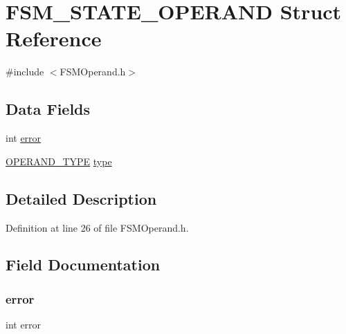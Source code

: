 \hypertarget{struct_f_s_m___s_t_a_t_e___o_p_e_r_a_n_d}{}\section{F\+S\+M\+\_\+\+S\+T\+A\+T\+E\+\_\+\+O\+P\+E\+R\+A\+ND Struct Reference}
\label{struct_f_s_m___s_t_a_t_e___o_p_e_r_a_n_d}


{\ttfamily \#include $<$F\+S\+M\+Operand.\+h$>$}

\subsection*{Data Fields}
\begin{DoxyCompactItemize}
\item 
int \mbox{\hyperlink{struct_f_s_m___s_t_a_t_e___o_p_e_r_a_n_d_a11614f44ef4d939bdd984953346a7572}{error}}
\item 
\mbox{\hyperlink{_f_s_m_operand_8h_aa2d7050d955e23a8f1a28c1ccf21111f}{O\+P\+E\+R\+A\+N\+D\+\_\+\+T\+Y\+PE}} \mbox{\hyperlink{struct_f_s_m___s_t_a_t_e___o_p_e_r_a_n_d_a0374dbe8bb9cccace9c5064f40c5b158}{type}}
\end{DoxyCompactItemize}


\subsection{Detailed Description}


Definition at line 26 of file F\+S\+M\+Operand.\+h.



\subsection{Field Documentation}
\mbox{\label{struct_f_s_m___s_t_a_t_e___o_p_e_r_a_n_d_a11614f44ef4d939bdd984953346a7572}} 
\subsubsection{\texorpdfstring{error}{error}}
{\footnotesize\ttfamily int error}



